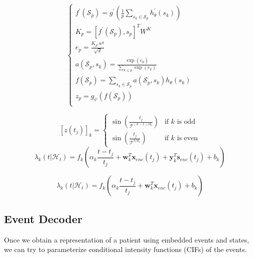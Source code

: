 \documentclass[journal,twoside,web]{ieeecolor}
\begin{document}
\begin{equation*}
    \begin{cases} 


f^{\prime}(\mathcal{S}_p) = g^{\prime} \left(   
 \frac{1}{p} \sum_{s_k \in \mathcal{S}_p}  h^{\prime}_{\theta}(s_k) 
\right) \\


K_p=[f^{\prime}(\mathcal{S}_p), s_p]^T W^K \\
e_p=\frac{K_p.w^q}{\sqrt{d}  }\\


a(\mathcal{S}_p,s_k)=\frac{\exp (e_p)}{\sum_{k\leq p} \exp (e_k)  } \\


f(\mathcal{S}_p) = \sum_{s_k \in \mathcal{S}_p}  a(\mathcal{S}_p,s_k)h_{\theta}(s_k) \\


z_p=g_{\psi}\left(         f(\mathcal{S}_p)         \right) \\



\end{cases} 
\end{equation*}

\begin{equation}\label{eq:1}
    [z(t_j)]_{k} = 
     \begin{cases} 
        \sin\left(  \frac{t_j}{\mathcal{T}^{(k-1)/d_t} }  \right) & \text{if } k \text{ is odd}\\
        \sin\left(  \frac{t_j}{\mathcal{T}^{k/d_t} }  \right) & \text{if } k \text{ is even}

        \end{cases} 
\end{equation} 
\begin{equation}
    \lambda_k(t|\mathcal{H}_t ) = f_k\left(\alpha_k \frac{t-t_j}{t_j}+\mathbf{w}_k^T \mathbf{x}_{enc}(t_j)+\mathbf{y}_k^T \mathbf{s}_{enc}(t_j) +b_k   \right)
\end{equation}

\begin{equation}
    \lambda_k(t|\mathcal{H}_t ) = f_k\left(\alpha_k \frac{t-t_j}{t_j}+\mathbf{w}_k^T \mathbf{x}_{enc}(t_j)+b_k   \right)
\end{equation}

\subsection{Event Decoder}
Once we obtain a representation of a patient using embedded events and states, we can try to parameterize conditional intensity functions (CIFs) of the events.
\end{document}
